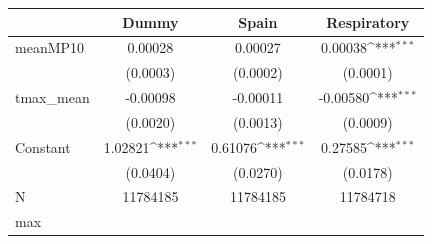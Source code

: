 {
\def\sym#1{\ifmmode^{#1}\else\(^{#1}\)\fi}
\begin{tabular}{l*{3}{c}}
\toprule
            &\multicolumn{1}{c}{Dummy}&\multicolumn{1}{c}{Spain}&\multicolumn{1}{c}{Respiratory}\\
\midrule
meanMP10    &     0.00028         &     0.00027         &     0.00038\sym{***}\\
            &    (0.0003)         &    (0.0002)         &    (0.0001)         \\
tmax\_mean   &    -0.00098         &    -0.00011         &    -0.00580\sym{***}\\
            &    (0.0020)         &    (0.0013)         &    (0.0009)         \\
Constant    &     1.02821\sym{***}&     0.61076\sym{***}&     0.27585\sym{***}\\
            &    (0.0404)         &    (0.0270)         &    (0.0178)         \\
\midrule
N           &    11784185         &    11784185         &    11784718         \\
max         &                     &                     &                     \\
\bottomrule
\end{tabular}
}
